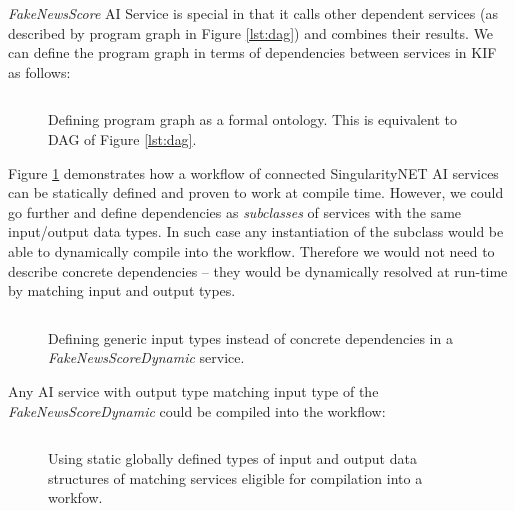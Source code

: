 \documentclass[]{report}
\begin{document}
\textit{FakeNewsScore} AI Service is special in that it calls
other dependent services (as described by program graph in Figure
\ref{lst:dag}) and combines their results. We can define the program graph in
terms of dependencies between services in KIF as follows:

\begin{figure}[H]
  \captionsetup{width=0.8\linewidth}
  \inputminted[firstline=1, lastline=9, linenos,tabsize=2,breaklines, fontsize=\small]{scm}{../../../ontology/FakeNewsScore.kif}
  \vspace{-0.3cm}
  \caption{\label{fig:serviceDependencies}Defining program graph as a formal ontology. This is equivalent to DAG of Figure \ref{lst:dag}.}
\end{figure}

Figure \ref{fig:serviceDependencies} demonstrates how a workflow of connected
SingularityNET AI services can be statically defined and proven to work at
compile time. However, we could go further and define dependencies as
\textit{subclasses} of services with the same input/output data types. In such case
any instantiation of the subclass would be able to dynamically compile into the
workflow. Therefore we would not need to describe concrete dependencies -- they
would be dynamically resolved at run-time by matching input and output types.

\begin{figure}[H]
  \captionsetup{width=0.8\linewidth}
  \inputminted[firstline=1, lastline=22, linenos,tabsize=2,breaklines, fontsize=\small]{scm}{../../../ontology/FakeNewsScoreDynamic.kif}
  \vspace{-0.3cm}
  \caption{\label{fig:fakeNewsScoreDynamic}Defining generic input types instead
  of concrete dependencies in a \textit{FakeNewsScoreDynamic} service.}
\end{figure}

Any AI service with output type matching input type of the
\textit{FakeNewsScoreDynamic} could be compiled into the workflow:

\begin{figure}[H]
  \captionsetup{width=0.8\linewidth}
  \inputminted[firstline=1, lastline=4, linenos,tabsize=2,breaklines, fontsize=\small]{scm}{../../../ontology/uclnlpDynamic.kif}
  \vspace{-0.3cm}
  \caption{\label{fig:uclnlpDynamicOne}Using static globally defined types of
  input and output data structures of matching services eligible for
  compilation into a workfow.}
\end{figure}
\end{document}
